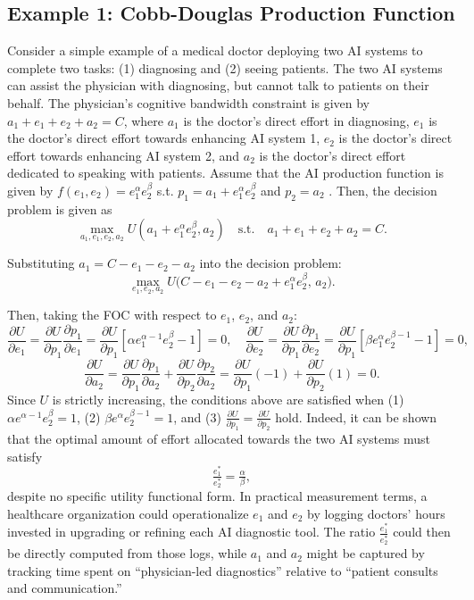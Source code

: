 \subsection{Example 1: Cobb-Douglas Production Function}
\label{ssec:Cobb}
Consider a simple example of a medical doctor deploying two AI systems to complete two tasks: (1) diagnosing and (2) seeing patients. The two AI systems can assist the physician with diagnosing, but cannot talk to patients on their behalf. The physician's cognitive bandwidth constraint is given by $a_1+e_1+e_2+a_2=C$, where $a_1$ is the doctor's direct effort in diagnosing, $e_1$ is the doctor's direct effort towards enhancing AI system 1, $e_2$ is the doctor's direct effort towards enhancing AI system 2, and $a_2$ is the doctor's direct effort dedicated to speaking with patients. Assume that the AI production function is given by $f(e_1,e_2)=e_1^\alpha e_2^{\beta}$ s.t. $p_1=a_1+e_1^\alpha e_2^{\beta}$ and $p_2=a_2$ \citep{cobb1928theory}. Then, the decision problem is given as
\[
\max_{a_1,e_1,e_2,a_2}U(a_1+e_1^\alpha e_2^{\beta},a_2)
\quad
\text{s.t.}
\quad
a_1+e_1+e_2+a_2=C.
\]

Substituting $a_1=C-e_1-e_2-a_2$ into the decision problem:
\[
\max_{e_1,e_2,a_2}U\bigl(C-e_1-e_2-a_2+e_1^\alpha e_2^{\beta},\,a_2\bigr).
\]

Then, taking the FOC with respect to $e_1$, $e_2$, and $a_2$:
\[
\frac{\partial U}{\partial e_1}=\frac{\partial U}{\partial p_1}\frac{\partial p_1}{\partial e_1}
=\frac{\partial U}{\partial p_1}[\alpha e_1^{\alpha-1}e_2^{\beta}-1]=0,\quad
\frac{\partial U}{\partial e_2}=\frac{\partial U}{\partial p_1}\frac{\partial p_1}{\partial e_2}
=\frac{\partial U}{\partial p_1}[\beta e_1^{\alpha}e_2^{\beta-1}-1]=0,
\]
\[
\frac{\partial U}{\partial a_2}
=\frac{\partial U}{\partial p_1}\frac{\partial p_1}{\partial a_2}+\frac{\partial U}{\partial p_2}\frac{\partial p_2}{\partial a_2}
=\frac{\partial U}{\partial p_1}(-1)+\frac{\partial U}{\partial p_2}(1)=0.
\]
Since $U$ is strictly increasing, the conditions above are satisfied when (1) $\alpha e^{\alpha-1}e_2^{\beta}=1$, (2) $\beta e^{\alpha}e_2^{\beta-1}=1$, and (3) $\tfrac{\partial U}{\partial p_1}=\tfrac{\partial U}{\partial p_2}$ hold. Indeed, it can be shown that the optimal amount of effort allocated towards the two AI systems must satisfy
\[
\tfrac{e^*_1}{e^*_2}=\tfrac{\alpha}{\beta},
\]
despite no specific utility functional form. In practical measurement terms, a healthcare organization could operationalize $e_1$ and $e_2$ by logging doctors' hours invested in upgrading or refining each AI diagnostic tool. The ratio $\tfrac{e_1^*}{e_2^*}$ could then be directly computed from those logs, while $a_1$ and $a_2$ might be captured by tracking time spent on “physician-led diagnostics” relative to “patient consults and communication.”


